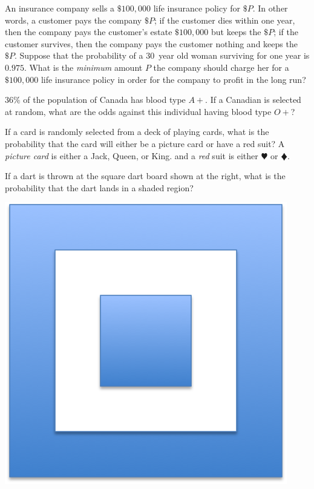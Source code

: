 \documentclass[addpoints,12pt]{exam}
\begin{document}
\begin{questions}

\question[12] An insurance company sells a $\$100,000$
life insurance policy for $\$P$. 
In other words, a customer pays the company $\$P$;
if the customer dies within one year, then the company
pays the customer's estate $\$100,000$ but keeps the $\$P$;
if the customer survives, then
the company pays the customer nothing and keeps the $\$P$. 
Suppose that the probability of a $30$~year old woman surviving
for one year is $0.975$.
What is the {\em minimum} amount $P$ the
company should charge her for a  $\$100,000$ life
insurance policy in order
for the company to profit in the long run?
\newpage

\question[8] $36\%$ of the population of Canada has blood type $A+$.
If a Canadian is selected at random, what are the odds
against this individual having blood type $O+$?
\vspace{1in}

\question[10] If a card is randomly selected from a deck
of playing cards, what is the probability that the card
will either be a picture card or have a red suit?
A {\em picture card} is either a Jack, Queen, or King.
and a {\em red} suit is either $\varheart$ or $\vardiamond$.
\vspace{1.5in}

\question[10]
\begin{multicols}{2}
If a dart is thrown at the square dart board shown at the right,
what is the probability that the dart lands in a shaded region?\\
\begin{center}\includegraphics[scale=.5]{Dart}\end{center}
\end{multicols}
\vspace{1.5in}


\end{questions}
\end{document}
